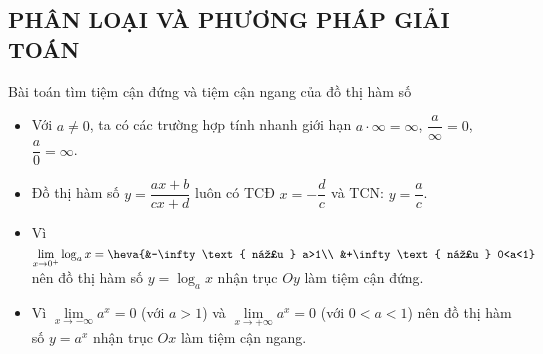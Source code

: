 \subsection{PHÂN LOẠI VÀ PHƯƠNG PHÁP GIẢI TOÁN}
\begin{dang}{Bài toán tìm tiệm cận đứng và tiệm cận ngang của đồ thị hàm số}
	\begin{itemize}
		\item Với $a \ne 0$, ta có các trường hợp tính nhanh giới hạn $a \cdot \infty = \infty$, $\dfrac{a}{\infty} = 0$, $\dfrac{a}{0}=\infty$.
		\item Đồ thị hàm số $y=\dfrac{ax+b}{cx+d}$ luôn có TCĐ $x=-\dfrac{d}{c}$ và TCN: $y=\dfrac{a}{c}$.
		\item Vì $\lim \limits_{x \to 0^+} \log_a x = \heva{&-\infty \text{ nếu } a>1\\ &+\infty \text{ nếu } 0<a<1}$ nên đồ thị hàm số $y=\log_a x$ nhận trục $Oy$ làm tiệm cận đứng.
		\item Vì $\lim \limits_{x \to -\infty} a^x = 0$ (với $a>1$) và $\lim \limits_{x \to +\infty} a^x = 0$ (với $0<a<1$) nên đồ thị hàm số $y=a^x$ nhận trục $Ox$ làm tiệm cận ngang.
	\end{itemize}
\end{dang}
\viduminhhoa
